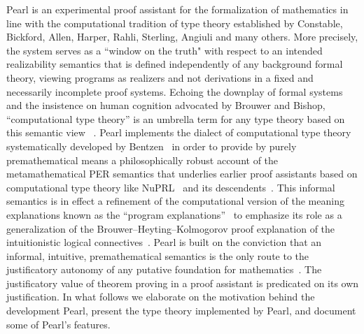 \documentclass[a4paper]{article}
\begin{document}
Pearl is an experimental proof assistant for the formalization of mathematics in line with the computational tradition of type theory established by Constable, Bickford, Allen, Harper, Rahli, Sterling, Angiuli and many others. More precisely, the system serves as a ``window on the truth" with respect to an intended realizability semantics that is defined independently of any background formal theory, viewing programs as realizers and not derivations in a fixed and necessarily incomplete proof systems. Echoing the downplay of formal systems and the insistence on human cognition advocated by Brouwer and Bishop, ``computational type theory'' is an umbrella term for any type theory based on this semantic view ~\cite{constable2009computational, angiuli2017chdtt,bentzen2026book}. Pearl implements the dialect of computational type theory systematically developed by Bentzen~\cite{bentzen2026book} in order to provide by purely premathematical means a philosophically robust account of the metamathematical PER semantics that underlies earlier proof assistants based on computational type theory like NuPRL~\cite{nuprl} and its descendents~\cite{hickey2001metaprl,jonprl,angiuli2018redprl}. This informal semantics is in effect a refinement of the computational version of the meaning explanations known as the ``program explanations''~\cite{bentzen2026book} to emphasize its role as a generalization of the Brouwer--Heyting--Kolmogorov proof explanation of the intuitionistic logical connectives~\cite{troelstravandalen1988constructivism}. 
Pearl is built on the conviction that an informal, intuitive, premathematical semantics is the only route to the justificatory autonomy of any putative foundation for mathematics~\cite{linnebo2011category,ladymanpresnell2017hottfoundation}. The justificatory value of theorem proving in a proof assistant is predicated on its own justification. In what follows we elaborate on the motivation behind the development Pearl, present the type theory implemented by Pearl, and document some of Pearl's features.

\end{document}
